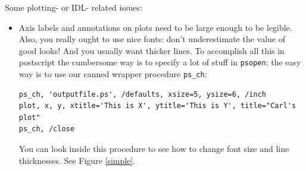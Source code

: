 \documentclass[11pt,preprint]{aastex}
\begin{document}
	Some plotting- or IDL- related issues: \begin{itemize}

	\item Axis labels and annotations on plots need to be large
enough to be legible.  Also, you really ought to use nice fonts: don't
underestimate the value of good looks! And you usually want thicker
lines. To accomplish all this in postscript the cumbersome way is to
specify a lot of stuff in {\tt psopen}; the easy way is to use our canned
wrapper procedure {\tt ps\_ch}:

\begin{verbatim}
ps_ch, 'outputfile.ps', /defaults, xsize=5, ysize=6, /inch
plot, x, y, xtitle='This is X', ytitle='This is Y', title="Carl's plot"
ps_ch, /close
\end{verbatim}

\noindent You can look inside this procedure to see how to change font
size and line thicknesses. See Figure \ref{simple}.


\end{itemize}
\end{document}
